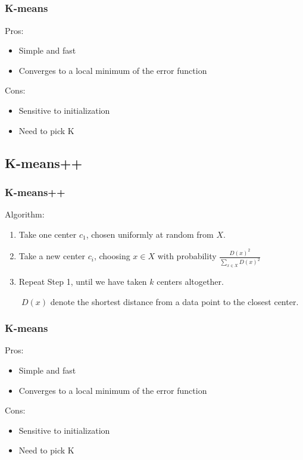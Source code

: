 \documentclass[notheorems,serif,table,compress]{beamer}  %
\begin{document}
\subsection{}
\begin{frame}
\frametitle{K-means}
{\color{blue}Pros:}
    \begin{itemize}
      \item Simple and fast
      \item Converges to a local minimum of the error function
    \end{itemize}
{\color{blue}Cons:}
    \begin{itemize}
    \item {\color{blue}Sensitive to initialization}
    \item Need to pick K
    \end{itemize}
\end{frame}

\subsection{K-means++}
\begin{frame}
\frametitle{K-means++}
{\color{blue}Algorithm:}
    \begin{enumerate}
      \item Take one center $c_{1}$, chosen uniformly at random from $X$.
      \item Take a new center $c_{i}$, choosing $x \in X$ with probability $\frac{D(x)^{2}}{\sum_{x \in X}D(x)^{2}}$
      \item Repeat Step 1, until we have taken $k$ centers altogether.\newline
      
    \end{enumerate}
    ~~~~$D(x)$ denote the shortest distance from a data point to the closest center.
\end{frame}

\begin{frame}
\frametitle{K-means}
{\color{blue}Pros:}
    \begin{itemize}
      \item Simple and fast
      \item Converges to a local minimum of the error function
    \end{itemize}
{\color{blue}Cons:}
    \begin{itemize}
    \item Sensitive to initialization 
    \item {\color{blue}Need to pick K}
    \end{itemize}
\end{frame}
\end{document}
